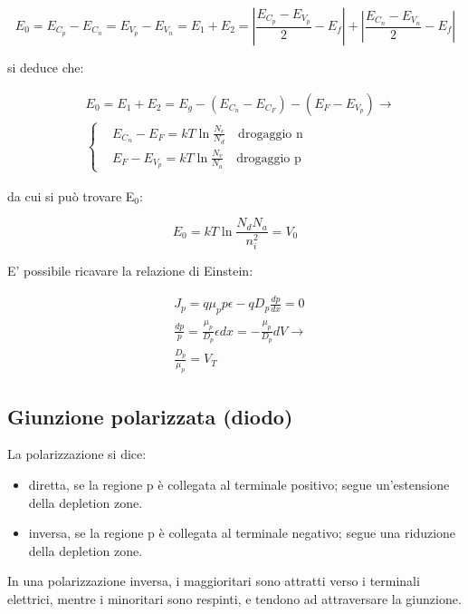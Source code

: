 \documentclass{article}
\begin{document}
\begin{equation}
    E_0=E_{C_p}-E_{C_n}= E_{V_p}-E_{V_n}=E_1+E_2= |\frac{E_{C_p}-E_{V_p}}{2}-E_f|+|\frac{E_{C_n}-E_{V_n}}{2}-E_f|
\end{equation}

si deduce che:

\begin{equation}
    \begin{aligned}
         & E_0=E_1+E_2=E_g-(E_{C_n}-E_{C_F})-(E_F-E_{V_p }) \rightarrow                  \\
         & \left\{\begin{aligned}
                       & E_{C_n}-E_F=kT\ln{\frac{N_c}{N_d}} \quad \text{drogaggio n} \\
                       & E_F-E_{V_p}=kT\ln{\frac{N_v}{N_a}} \quad \text{drogaggio p}
                  \end{aligned}
        \right.
    \end{aligned}
\end{equation}

da cui si può trovare E$_0$:

\begin{equation}
    E_0=kT\ln{\frac{N_dN_a}{n_i^2}}=V_0
\end{equation}

E' possibile ricavare la relazione di Einstein:

\begin{equation}
    \begin{aligned}
         & J_p=q\mu_pp\epsilon-qD_p\frac{dp}{dx}=0                                    \\
         & \frac{dp}{p}=\frac{\mu_p}{D_p}\epsilon dx=-\frac{\mu_p}{D_p}dV \rightarrow \\
         & \frac{D_p}{\mu_p}=V_T
    \end{aligned}
\end{equation}

\subsection{Giunzione polarizzata (diodo)}

La polarizzazione si dice:

\begin{itemize}
    \item diretta, se la regione p è collegata al terminale positivo; segue un'estensione della depletion zone.
    \item inversa, se la regione p è collegata al terminale negativo; segue una riduzione della depletion zone.
\end{itemize}
In una polarizzazione inversa, i maggioritari sono attratti verso i terminali elettrici, mentre i minoritari sono respinti, e tendono ad attraversare la giunzione.
\end{document}
